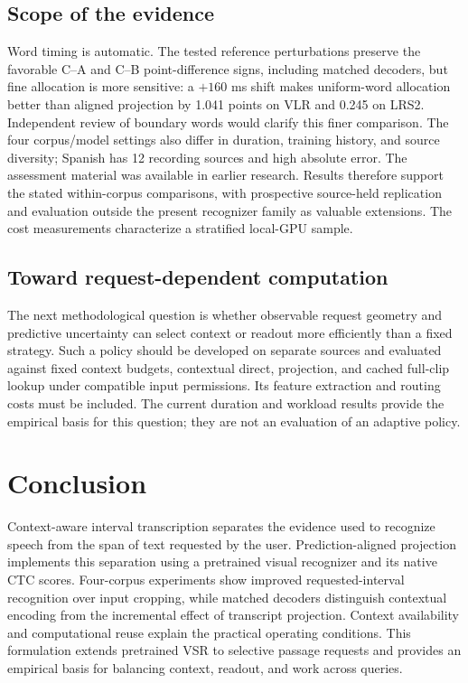 \subsection{Scope of the evidence}
Word timing is automatic. The tested reference perturbations preserve the
favorable C--A and C--B point-difference signs, including matched decoders,
but fine allocation is more sensitive: a \(+160\) ms shift makes uniform-word
allocation better than aligned projection by 1.041 points on VLR and 0.245 on
LRS2. Independent review of boundary words would clarify this finer comparison.
The four corpus/model settings also differ in duration, training history, and
source diversity; Spanish has 12 recording sources and high absolute error.
The assessment material was available in earlier research. Results therefore
support the stated within-corpus comparisons, with prospective source-held
replication and evaluation outside the present recognizer family as valuable
extensions. The cost measurements characterize a stratified local-GPU sample.

\subsection{Toward request-dependent computation}
The next methodological question is whether observable request geometry and
predictive uncertainty can select context or readout more efficiently than a
fixed strategy. Such a policy should be developed on separate sources and
evaluated against fixed context budgets, contextual direct, projection, and
cached full-clip lookup under compatible input permissions. Its feature
extraction and routing costs must be included. The current duration and workload
results provide the empirical basis for this question; they are not an
evaluation of an adaptive policy.

\section{Conclusion}
Context-aware interval transcription separates the evidence used to recognize
speech from the span of text requested by the user. Prediction-aligned projection
implements this separation using a pretrained visual recognizer and its native
CTC scores. Four-corpus experiments show improved requested-interval recognition
over input cropping, while matched decoders distinguish contextual encoding
from the incremental effect of transcript projection. Context availability and
computational reuse explain the practical operating conditions. This formulation
extends pretrained VSR to selective passage requests and provides an empirical
basis for balancing context, readout, and work across queries.
